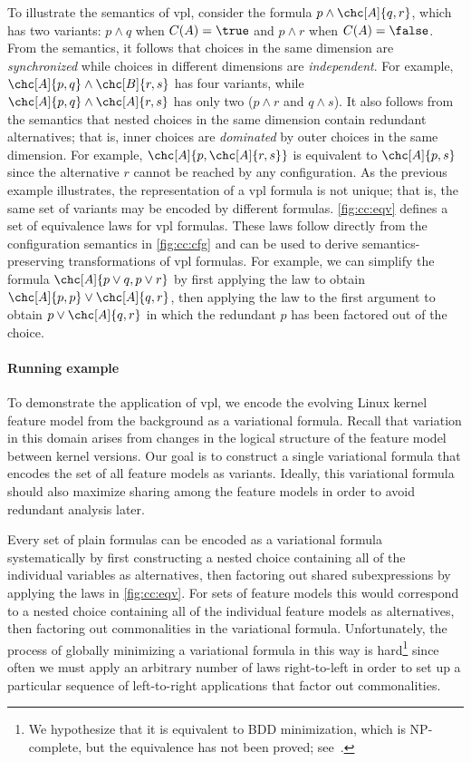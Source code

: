To illustrate the semantics of \ac{vpl}, consider the formula
$p\wedge\chc[A]{q,r}$, which has two variants: $p\wedge q$ when $C(A)=\true$
and $p\wedge r$ when $C(A)=\false$.
%
From the semantics, it follows that choices in the same dimension are
\emph{synchronized} while choices in different dimensions are
\emph{independent}. For example, $\chc[A]{p,q}\wedge\chc[B]{r,s}$ has four
variants, while $\chc[A]{p,q}\wedge\chc[A]{r,s}$ has only two ($p\wedge r$ and
$q\wedge s$).
%
It also follows from the semantics that nested choices in the same dimension
contain redundant alternatives; that is, inner choices are \emph{dominated} by
outer choices in the same dimension. For example, $\chc[A]{p,\chc[A]{r,s}}$ is
equivalent to $\chc[A]{p,s}$ since the alternative $r$ cannot be reached by any
configuration.
%
As the previous example illustrates, the representation of a \ac{vpl} formula is
not unique; that is, the same set of variants may be encoded by different
formulas. \autoref{fig:cc:eqv} defines a set of equivalence laws for
\ac{vpl} formulas. These laws follow directly from the configuration semantics in
\autoref{fig:cc:cfg} and can be used to derive semantics-preserving
transformations of \ac{vpl} formulas.
%
For example, we can simplify the formula $\chc[A]{p\vee q, p\vee r}$ by first
applying the  law to obtain $\chc[A]{p,p}\vee\chc[A]{q,r}$, then applying
the  law to the first argument to obtain $p\vee\chc[A]{q,r}$ in which
the redundant $p$ has been factored out of the choice.
%
\paragraph{Running example}
To demonstrate the application of \ac{vpl}, we encode the evolving Linux kernel
feature model from the background as a variational formula. Recall that
variation in this domain arises from changes in the logical structure of the
feature model between kernel versions. Our goal is to construct a single
variational formula that encodes the set of all feature models as variants.
Ideally, this variational formula should also maximize sharing among the feature
models in order to avoid redundant analysis later.

Every set of plain formulas can be encoded as a variational formula
systematically by first constructing a nested choice containing all of the
individual variables as alternatives, then factoring out shared subexpressions
by applying the laws in \autoref{fig:cc:eqv}. For sets of feature models this would
correspond to a nested choice containing all of the individual feature models as
alternatives, then factoring out commonalities in the variational formula.
%
Unfortunately, the process of globally minimizing a variational formula in this
way is hard\footnote{\label{vpl:bdd}We hypothesize that it is equivalent to BDD minimization,
which is NP-complete, but the equivalence has not been proved;
see~\cite{Walk14onward}.} since often we must apply an arbitrary number of laws
right-to-left in order to set up a particular sequence of left-to-right
applications that factor out commonalities.

